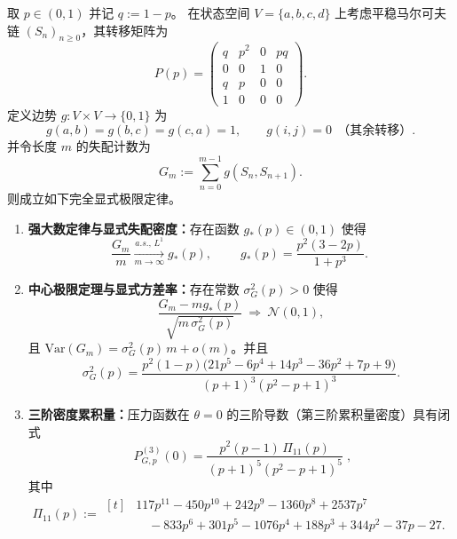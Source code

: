 \begin{theorem}\label{thm:fold-gauge-anomaly-bernoulli-p-laws}
取 \(p\in(0,1)\) 并记 \(q:=1-p\)。
在状态空间 \(V=\{a,b,c,d\}\) 上考虑平稳马尔可夫链 \((S_n)_{n\ge 0}\)，其转移矩阵为
\begin{equation}\label{eq:fold-gauge-anomaly-bernoulli-p-transition}
P(p)=
\begin{pmatrix}
q & p^2 & 0 & pq\\
0 & 0 & 1 & 0\\
q & p & 0 & 0\\
1 & 0 & 0 & 0
\end{pmatrix}.
\end{equation}
定义边势 \(g:V\times V\to\{0,1\}\) 为
\begin{equation}\label{eq:fold-gauge-anomaly-bernoulli-p-edge-potential}
g(a,b)=g(b,c)=g(c,a)=1,
\qquad
g(i,j)=0\ \ \text{（其余转移）}.
\end{equation}
并令长度 \(m\) 的失配计数为
\begin{equation}\label{eq:fold-gauge-anomaly-bernoulli-p-mismatch-sum}
G_m:=\sum_{n=0}^{m-1} g(S_n,S_{n+1}).
\end{equation}
则成立如下完全显式极限定律。
\begin{enumerate}
  \item \textbf{强大数定律与显式失配密度：}存在函数 \(g_\ast(p)\in(0,1)\) 使得
  \[
  \frac{G_m}{m}\xrightarrow[m\to\infty]{a.s.,\,L^1}g_\ast(p),
  \qquad
  \boxed{\;
  g_\ast(p)=\frac{p^2(3-2p)}{1+p^3}. \;}
  \]

  \item \textbf{中心极限定理与显式方差率：}存在常数 \(\sigma_G^2(p)>0\) 使得
  \[
  \frac{G_m-mg_\ast(p)}{\sqrt{m\,\sigma_G^2(p)}}\ \Rightarrow\ \mathcal N(0,1),
  \]
  且 \(\mathrm{Var}(G_m)=\sigma_G^2(p)\,m+o(m)\)。并且
  \[
  \boxed{\;
  \sigma_G^2(p)=
  \frac{p^2(1-p)\bigl(21 p^5 - 6 p^4 + 14 p^3 - 36 p^2 + 7 p + 9\bigr)}
  {(p+1)^3(p^2-p+1)^3}. \;}
  \]

  \item \textbf{三阶密度累积量：}压力函数在 \(\theta=0\) 的三阶导数（第三阶累积量密度）具有闭式
  \[
  \boxed{\;
  P_{G,p}^{(3)}(0)=\frac{p^2(p-1)\,\Pi_{11}(p)}{(p+1)^5(p^2-p+1)^5}\;},
  \]
  其中
  \[
  \Pi_{11}(p):=
  \begin{aligned}[t]
    &117p^{11}-450p^{10}+242p^9-1360p^8+2537p^7\\
    &\quad-833p^6+301p^5-1076p^4+188p^3+344p^2-37p-27.
  \end{aligned}
  \]


\end{enumerate}
\end{theorem}
